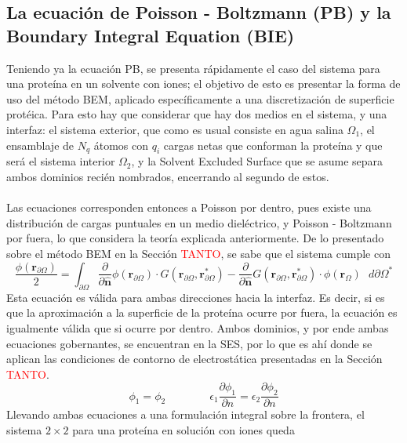 \documentclass[12pt, oneside, numbers, spanish]{ezthesis}
\numberwithin{equation}{section}
\begin{document}
\subsection{La ecuación de Poisson - Boltzmann (PB) y la Boundary Integral Equation (BIE)}\label{subsec:BIE_PB}
Teniendo ya la ecuación PB, se presenta rápidamente el caso del sistema para una proteína en un solvente con iones; el objetivo de esto es presentar la forma de uso del método BEM, aplicado específicamente a una discretización de superficie protéica. Para esto hay que considerar que hay dos medios en el sistema, y una interfaz: el sistema exterior, que como es usual consiste en agua salina $\Omega_1$, el ensamblaje de $N_q$ átomos con $q_i$ cargas netas que conforman la proteína y que será el sistema interior $\Omega_2$, y la Solvent Excluded Surface que se asume separa ambos dominios recién nombrados, encerrando al segundo de estos.\\\\
Las ecuaciones corresponden entonces a Poisson por dentro, pues existe una distribución de cargas puntuales en un medio dieléctrico, y Poisson - Boltzmann por fuera, lo que considera la teoría explicada anteriormente. De lo presentado sobre el método BEM en la Sección \textcolor{red}{TANTO}, se sabe que el sistema cumple con
\begin{equation}
\frac{\phi(\mathbf{r}_{\partial\Omega})}{2} = \int_{\partial\Omega}\frac{\partial}{\partial\hat{\mathbf{n}}}\phi(\mathbf{r}_{\partial\Omega})\cdot G(\mathbf{r}_{\partial\Omega},\mathbf{r}_{\partial\Omega}^*) - \frac{\partial}{\partial\hat{\mathbf{n}}}G(\mathbf{r}_{\partial\Omega},\mathbf{r}_{\partial\Omega}^*)\cdot\phi(\mathbf{r}_\Omega)\text{ }d\partial\Omega^*
\end{equation}
Esta ecuación es válida para ambas direcciones hacia la interfaz. Es decir, si es que la aproximación a la superficie de la proteína ocurre por fuera, la ecuación es igualmente válida que si ocurre por dentro. Ambos dominios, y por ende ambas ecuaciones gobernantes, se encuentran en la SES, por lo que es ahí donde se aplican las condiciones de contorno de electrostática presentadas en la Sección \textcolor{red}{TANTO}.
\begin{equation}
\phi_1 = \phi_2 \qquad\qquad \epsilon_1\frac{\partial\phi_1}{\partial n} = \epsilon_2\frac{\partial\phi_2}{\partial n}
\end{equation}
Llevando ambas ecuaciones a una formulación integral sobre la frontera, el sistema $2\times2$ para una proteína en solución con iones queda \cite{Cooper2015}
\end{document}
